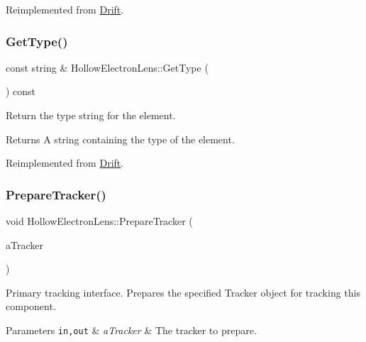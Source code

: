 Reimplemented from \hyperlink{classDrift_a19bc19d48348912f8693e3ebbf9e92f2}{Drift}.

\mbox{\label{classHollowElectronLens_add07b8f08bad11edfb3df87be488e9ff}} 
\subsubsection{\texorpdfstring{Get\+Type()}{GetType()}}
{\footnotesize\ttfamily const string \& Hollow\+Electron\+Lens\+::\+Get\+Type (\begin{DoxyParamCaption}{ }\end{DoxyParamCaption}) const\hspace{0.3cm}{\ttfamily [virtual]}}

Return the type string for the element. \begin{DoxyReturn}{Returns}
A string containing the type of the element. 
\end{DoxyReturn}


Reimplemented from \hyperlink{classDrift_a9f5e7d0aafd8689a4420b3d5e7b6879e}{Drift}.

\mbox{\label{classHollowElectronLens_a86e8e69936f636a5d3fa0675e0434bf4}} 
\subsubsection{\texorpdfstring{Prepare\+Tracker()}{PrepareTracker()}}
{\footnotesize\ttfamily void Hollow\+Electron\+Lens\+::\+Prepare\+Tracker (\begin{DoxyParamCaption}\item[{\hyperlink{classComponentTracker}{Component\+Tracker} \&}]{a\+Tracker }\end{DoxyParamCaption})\hspace{0.3cm}{\ttfamily [virtual]}}

Primary tracking interface. Prepares the specified Tracker object for tracking this component. 
\begin{DoxyParams}[1]{Parameters}
\mbox{\tt in,out}  & {\em a\+Tracker} & The tracker to prepare. \\
\hline
\end{DoxyParams}


